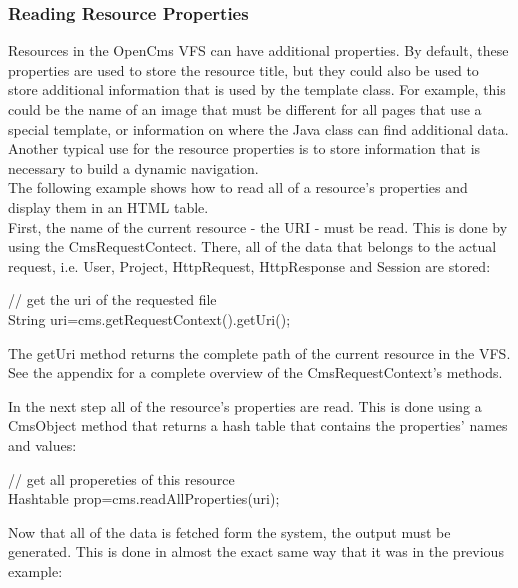 \subsubsection{Reading Resource Properties}
Resources in the OpenCms VFS can have additional properties. By default,
these properties are used to store the resource title, but they could
also be used to store additional information that is used by the
template class. For example, this could be the name of an image that
must be different for all pages that use a special template, or
information on where the Java class can find additional data. Another
typical use for the resource properties is to store information that is
necessary to build a dynamic navigation.\\

The following example shows how to read all of a resource's properties
and display them in an HTML table.\\

First, the name of the current resource - the URI - must be read. This
is done by using the {\name CmsRequestContect}. There, all of the data that
belongs to the actual request, i.e. User, Project, HttpRequest,
HttpResponse and Session are stored:\\

\begin{java}
// get the uri of the requested file\\
 String uri=cms.getRequestContext().getUri();\\
\end{java}

The getUri method returns the complete path of the current resource in
the VFS. See the appendix for a complete overview of the
{\name CmsRequestContext's} methods.

In the next step all of the {\name resource's} properties are read. This is
done using a CmsObject method that returns a hash table that contains
the {\name properties'} names and values:

\begin{java} 
// get all propereties of this resource\\
 Hashtable prop=cms.readAllProperties(uri);\\
\end{java}

Now that all of the data is fetched form the system, the output must be
generated. This is done in almost the exact same way that it was in the
previous example:

